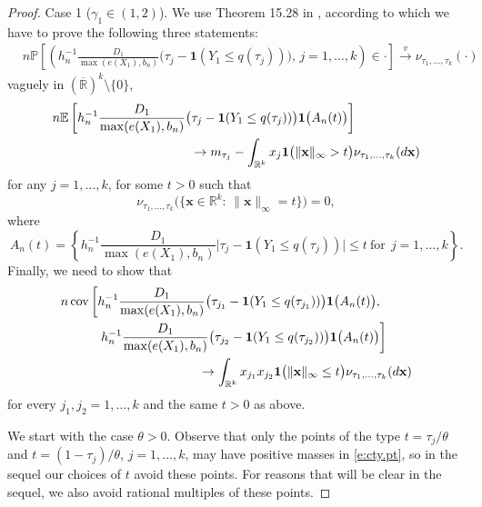 \documentclass[12pt]{amsart}
\newcommand{\bbr}{\mathbb{R}}
\newcommand{\vague}{\stackrel{v}{\rightarrow}}
\newcommand{\cov}{\mathrm{cov}}
\newcommand{\1}{\mathbbm{1}}
\newcommand{\0}{\mathbf{0}}
\newcommand{\one}{\mathbf{1}}
\newcommand{\E}{\mathbb{E}}
\theoremstyle{plain}
\theoremstyle{definition}
\newcommand{\bbP}{\mathbb{P}}
\newcommand{\bx}{\mathbf{x}}
\begin{document}
\begin{proof}  Case 1  ($\gamma_1\in(1,2)$).
We use Theorem 15.28 in \cite{kallenberg:2002}, according to which we
have to prove the following three statements:
\begin{align} \label{e:right.t}
&n\bbP\left[\left( h_n^{-1}\frac{D_1}{\max(e(X_1),b_n)}
  \bigl( \tau_j-\one(Y_1\leq q(\tau_j))\bigr), \, j=1,\ldots,
                                  k \right)\in \cdot\right] \vague 
                                  \nu_{\tau_1,\ldots, \tau_k}(\cdot) 
\end{align}
vaguely in $(\overline{\bbr})^k\setminus \{0\}$, 
 \begin{align} \label{e:tr.m}
&n\E\left[ h_n^{-1}\frac{D_1}{\max(e(X_1),b_n)}
  \bigl( \tau_j-\one(Y_1\leq q(\tau_j))\bigr) \one\bigl( A_n(t)\bigr)\right] \\
\notag &\hskip 1.5in \to
m_{\tau_j} - \int_{\bbr^k} x_j\one\bigl( \|\bx\|_\infty>t\bigr)
\nu_{\tau_1,\ldots, \tau_k}(d\bx)  
 \end{align}
 for any $j=1,\ldots, k$, for
 some $t>0$  such that
\begin{equation} \label{e:cty.pt}
\nu_{\tau_1,\ldots, \tau_k}\bigl( \bigl\{ \bx\in\bbr^{k}:\,
\|\bx\|_\infty=t\bigr\}\bigr)=0, 
\end{equation}
%
where 
%
 \begin{equation*} \label{e:A.n}
A_n(t) = \left\{ h_n^{-1}\frac{D_1}{\max(e(X_1),b_n)}
  \bigl| \tau_j-\one(Y_1\leq q(\tau_j))\bigr|\leq t \ \text{for} \ \
  j=1,\ldots, k\right\}. 
\end{equation*}
%
Finally, we need to show that 
\begin{align} \label{e:tr.v}
&n\, \cov\left[ h_n^{-1}\frac{D_1}{\max(e(X_1),b_n)}
  \bigl( \tau_{j_1}-\one(Y_1\leq q(\tau_{j_1}))\bigr)  \one\bigl(
                               A_n(t)\bigr), \right. \\
\notag &\left. \hskip 0.4in h_n^{-1}\frac{D_1}{\max(e(X_1),b_n)}
  \bigl( \tau_{j_2}-\one(Y_1\leq q(\tau_{j_2}))\bigr)  \one\bigl(
                               A_n(t)\bigr)\right] \\
\notag &\hskip 1.5in 
 \to
\int_{\bbr^k} x_{j_1}x_{j_2}\one\bigl( \|\bx\|_\infty\leq t\bigr)
\nu_{\tau_1,\ldots, \tau_k}(d\bx)  
\end{align}
for every $j_1,j_2=1,\ldots, k$ and the same $t>0$ as above. 

We start with the case $\theta>0$. 
Observe that only the points of the type $t=\tau_j/\theta$ and
$t=(1-\tau_j )/\theta$, $j=1,\ldots, k$, may 
have positive masses in \eqref{e:cty.pt}, 
so in the sequel our choices of $t$ avoid these
points. 
For reasons that will be clear in the sequel, we also
avoid rational multiples of these points. 


\end{proof}
\end{document}

